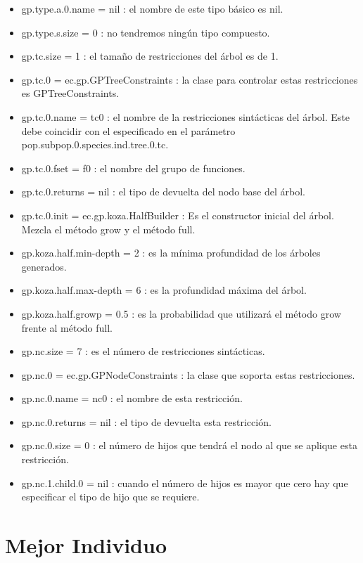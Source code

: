 \begin{itemize}
\item	gp.type.a.0.name = nil : el nombre de este tipo básico es nil.
\item	gp.type.s.size = 0 : no tendremos ningún tipo compuesto.
\item	gp.tc.size = 1 : el tamaño de restricciones del árbol es de 1.
\item	gp.tc.0 = ec.gp.GPTreeConstraints : la clase para controlar estas restricciones es GPTreeConstraints.
\item	gp.tc.0.name = tc0 : el nombre de la restricciones sintácticas del árbol. Este debe coincidir con el especificado en el parámetro pop.subpop.0.species.ind.tree.0.tc.
\item	gp.tc.0.fset = f0 : el nombre del grupo de funciones.
\item	gp.tc.0.returns = nil : el tipo de devuelta del nodo base del árbol.
\item	gp.tc.0.init = ec.gp.koza.HalfBuilder : Es el constructor inicial del árbol. Mezcla el método grow y el método full.
\item	gp.koza.half.min-depth = 2 : es la mínima profundidad de los árboles generados.
\item	gp.koza.half.max-depth = 6 : es la profundidad máxima del árbol.
\item	gp.koza.half.growp = 0.5 : es la probabilidad que utilizará el método grow frente al método full.
\item	gp.nc.size = 7 : es el  número de restricciones sintácticas.
\item	gp.nc.0 = ec.gp.GPNodeConstraints : la clase que soporta estas restricciones.
\item	gp.nc.0.name = nc0 : el nombre de esta restricción.
\item	gp.nc.0.returns = nil : el tipo de devuelta esta restricción.
\item	gp.nc.0.size = 0 : el número de hijos que tendrá el nodo al que se aplique esta restricción. 
\item	gp.nc.1.child.0 = nil : cuando el número de hijos es mayor que cero hay que especificar el tipo de hijo que se requiere.
\end{itemize}

\section{Mejor Individuo}\label{sec:mejor-individuo}

